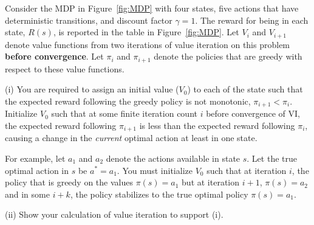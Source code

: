 \documentclass[11pt]{article}
\begin{document}
\begin{enumerate}
	Consider the MDP in Figure~\ref{fig:MDP} with four states, five actions that have deterministic transitions, and discount factor $\gamma=1$. The reward for being in each state, $R(s)$, is reported in the table in Figure~\ref{fig:MDP}.  Let $V_i$ and $V_{i+1}$ denote value functions from two  iterations of value iteration on this problem \textbf{before convergence}. Let  $\pi_i$ and $\pi_{i+1}$ denote the policies that are greedy with respect to these value functions. 
	
	
	(i) You are required to assign an initial value ($V_0$) to each of the state such that the expected reward following the greedy policy is not monotonic, $\pi_{i+1} < \pi_i$. Initialize $V_0$ such that at some finite iteration count $i$ before convergence of VI, the expected reward following $\pi_{i+1}$ is less than the expected reward following $\pi_i$, causing a change in the \textit{current} optimal action at least in one state.
	
	For example, let $a_1$ and $a_2$ denote the actions available in state $s$. Let the true optimal action in $s$ be $a^*=a_1$. You must initialize $V_0$ such that at iteration $i$, the policy that is greedy on the values $\pi(s) = a_1$ but at iteration $i+1$, $\pi(s) = a_2$ and in some $i+k$, the policy stabilizes to the true optimal policy $\pi(s) =a_1$.
	
	(ii) Show your calculation of value iteration to support (i). 
	

\end{enumerate}
\end{document}
